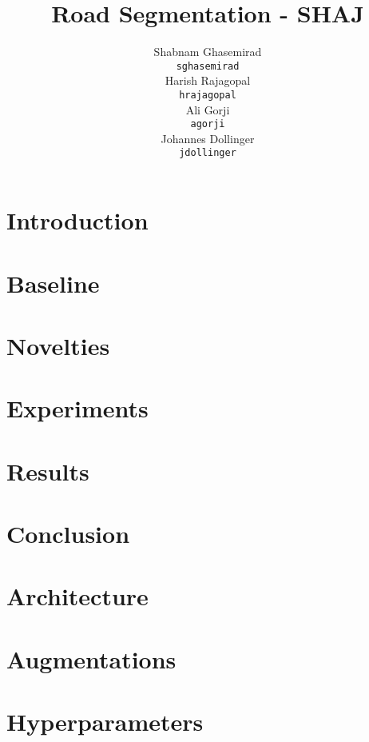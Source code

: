 \documentclass[twocolumn]{article}
\title{Road Segmentation - SHAJ}
\author{
  Shabnam Ghasemirad\\
  \texttt{sghasemirad} \\
   \And
  Harish Rajagopal \\
  \texttt{hrajagopal} \\
   \And
  Ali Gorji \\
  \texttt{agorji} \\
   \And
  Johannes Dollinger \\
  \texttt{jdollinger} \\
}
\begin{document}
\twocolumn[\maketitle]

\section{Introduction} \label{intro}


\section{Baseline}\label{section:baselines}


\section{Novelties}\label{section:novelties}


\section{Experiments}\label{section:experiments}


\section{Results}\label{section:results}


\section{Conclusion}\label{section:conclusion}


\newpage

\small
\printbibliography{}

\appendix

\section{Architecture}\label{appendix:architecture}


\section{Augmentations}\label{appendix:augmentations}


\section{Hyperparameters}\label{appendix:hyper-params}

\end{document}
